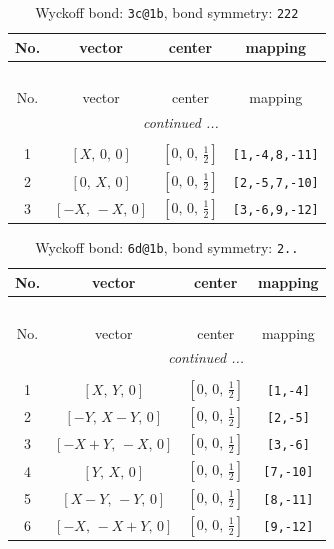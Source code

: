 \documentclass[fleqn,8pt]{jsarticle}
\begin{document}
\begin{longtable}{cccc}
\caption{Wyckoff bond: {\tt 3c@1b}, bond symmetry: {\tt 222}}
 \\
 \hline \hline
No. & vector & center & mapping \\ \hline \endfirsthead

\multicolumn{3}{l}{\tablename\ \thetable{}} \\
 \hline \hline
No. & vector & center & mapping \\ \hline \endhead

 \hline \hline
\multicolumn{3}{r}{\footnotesize\it continued ...} \\ \endfoot

 \hline \hline
\multicolumn{3}{r}{} \\ \endlastfoot

1 & $\left[ X,\, 0,\, 0 \right]$ & $\left[ 0,\, 0,\, \frac{1}{2} \right]$ & {\tt [1,-4,8,-11]} \\ \hline
2 & $\left[ 0,\, X,\, 0 \right]$ & $\left[ 0,\, 0,\, \frac{1}{2} \right]$ & {\tt [2,-5,7,-10]} \\ \hline
3 & $\left[ - X,\, - X,\, 0 \right]$ & $\left[ 0,\, 0,\, \frac{1}{2} \right]$ & {\tt [3,-6,9,-12]} \\
\end{longtable}
\renewcommand{\arraystretch}{1.2}
\begin{longtable}{cccc}
\caption{Wyckoff bond: {\tt 6d@1b}, bond symmetry: {\tt 2..}}
 \\
 \hline \hline
No. & vector & center & mapping \\ \hline \endfirsthead

\multicolumn{3}{l}{\tablename\ \thetable{}} \\
 \hline \hline
No. & vector & center & mapping \\ \hline \endhead

 \hline \hline
\multicolumn{3}{r}{\footnotesize\it continued ...} \\ \endfoot

 \hline \hline
\multicolumn{3}{r}{} \\ \endlastfoot

1 & $\left[ X,\, Y,\, 0 \right]$ & $\left[ 0,\, 0,\, \frac{1}{2} \right]$ & {\tt [1,-4]} \\ \hline
2 & $\left[ - Y,\, X - Y,\, 0 \right]$ & $\left[ 0,\, 0,\, \frac{1}{2} \right]$ & {\tt [2,-5]} \\ \hline
3 & $\left[ - X + Y,\, - X,\, 0 \right]$ & $\left[ 0,\, 0,\, \frac{1}{2} \right]$ & {\tt [3,-6]} \\ \hline
4 & $\left[ Y,\, X,\, 0 \right]$ & $\left[ 0,\, 0,\, \frac{1}{2} \right]$ & {\tt [7,-10]} \\ \hline
5 & $\left[ X - Y,\, - Y,\, 0 \right]$ & $\left[ 0,\, 0,\, \frac{1}{2} \right]$ & {\tt [8,-11]} \\ \hline
6 & $\left[ - X,\, - X + Y,\, 0 \right]$ & $\left[ 0,\, 0,\, \frac{1}{2} \right]$ & {\tt [9,-12]} \\
\end{longtable}
\end{document}
